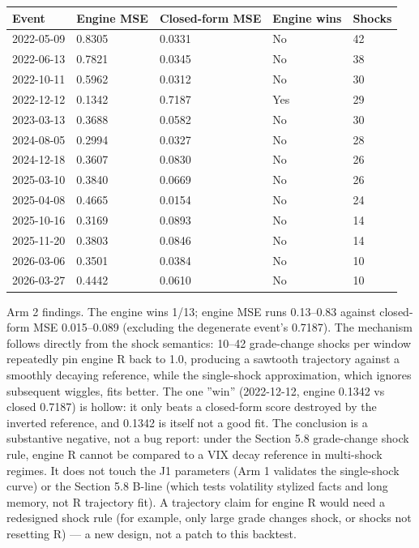\documentclass[11pt]{article}
\begin{document}
\begin{table}[htbp]
\centering
\begin{tabular}{lllll}
\toprule
\textbf{Event} & \textbf{Engine MSE} & \textbf{Closed-form MSE} & \textbf{Engine wins} & \textbf{Shocks} \\
\midrule
2022-05-09 & 0.8305 & 0.0331 & No & 42 \\
2022-06-13 & 0.7821 & 0.0345 & No & 38 \\
2022-10-11 & 0.5962 & 0.0312 & No & 30 \\
2022-12-12 & 0.1342 & 0.7187 & Yes & 29 \\
2023-03-13 & 0.3688 & 0.0582 & No & 30 \\
2024-08-05 & 0.2994 & 0.0327 & No & 28 \\
2024-12-18 & 0.3607 & 0.0830 & No & 26 \\
2025-03-10 & 0.3840 & 0.0669 & No & 26 \\
2025-04-08 & 0.4665 & 0.0154 & No & 24 \\
2025-10-16 & 0.3169 & 0.0893 & No & 14 \\
2025-11-20 & 0.3803 & 0.0846 & No & 14 \\
2026-03-06 & 0.3501 & 0.0384 & No & 10 \\
2026-03-27 & 0.4442 & 0.0610 & No & 10 \\
\bottomrule
\end{tabular}
\end{table}

Arm 2 findings. The engine wins 1/13; engine MSE runs 0.13--0.83 against closed-form MSE 0.015--0.089 (excluding the degenerate event's 0.7187). The mechanism follows directly from the shock semantics: 10--42 grade-change shocks per window repeatedly pin engine R back to 1.0, producing a sawtooth trajectory against a smoothly decaying reference, while the single-shock approximation, which ignores subsequent wiggles, fits better. The one ''win'' (2022-12-12, engine 0.1342 vs closed 0.7187) is hollow: it only beats a closed-form score destroyed by the inverted reference, and 0.1342 is itself not a good fit. The conclusion is a substantive negative, not a bug report: under the Section 5.8 grade-change shock rule, engine R cannot be compared to a VIX decay reference in multi-shock regimes. It does not touch the J1 parameters (Arm 1 validates the single-shock curve) or the Section 5.8 B-line (which tests volatility stylized facts and long memory, not R trajectory fit). A trajectory claim for engine R would need a redesigned shock rule (for example, only large grade changes shock, or shocks not resetting R) --- a new design, not a patch to this backtest.
\end{document}
